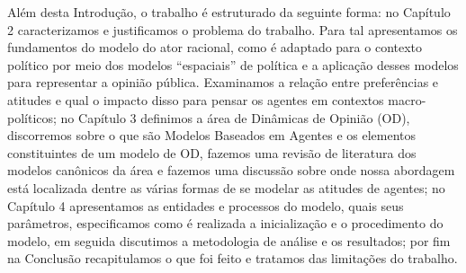 Além desta Introdução, o trabalho é estruturado da seguinte forma: no Capítulo 2
caracterizamos e justificamos o problema do trabalho. Para tal apresentamos os
fundamentos do modelo do ator racional, como é adaptado para o contexto político
por meio dos modelos ``espaciais'' de política e a aplicação desses modelos para
representar a opinião pública. Examinamos a relação entre preferências e
atitudes e qual o impacto disso para pensar os agentes em contextos
macro-políticos; no Capítulo 3 definimos a área de Dinâmicas de Opinião (OD),
discorremos sobre o que são Modelos Baseados em Agentes e os elementos
constituintes de um modelo de OD, fazemos uma revisão de literatura dos modelos
canônicos da área e fazemos uma discussão sobre onde nossa abordagem está
localizada dentre as várias formas de se modelar as atitudes de agentes; no
Capítulo 4 apresentamos as entidades e processos do modelo, quais seus
parâmetros, especificamos como é realizada a inicialização e o procedimento do
modelo, em seguida discutimos a metodologia de análise e os resultados; por fim
na Conclusão recapitulamos o que foi feito e tratamos das limitações do
trabalho.



